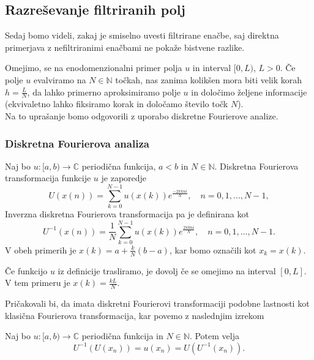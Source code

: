 \documentclass[mat2, tisk]{fmfdelo}
\newcommand{\N}{\mathbb N}
\newcommand{\C}{\mathbb C}
\begin{document}
\subsection{Razreševanje filtriranih polj}

Sedaj bomo videli, zakaj je smiselno uvesti filtrirane enačbe, saj 
direktna primerjava z nefiltriranimi enačbami ne pokaže bistvene razlike.

Omejimo, se na enodomenzionalni primer polja $u$ in interval $[0, L)$, 
$L > 0$. Če polje $u$ evalviramo na $N \in \N$ točkah, nas zanima 
kolikšen mora biti velik korah $h = \frac{L}{N}$, da lahko primerno aproksimiramo 
polje $u$ in določimo željene informacije (ekvivaletno lahko fiksiramo 
korak in določamo število točk $N$). \\
Na to uprašanje bomo odgovorili z uporabo diskretne Fourierove analize. 

\subsubsection{Diskretna Fourierova analiza}

\begin{definicija}
Naj bo $u: [a, b) \rightarrow \C$ periodična funkcija, $a < b$ in $N\in \N$. 
Diskretna Fourierova transformacija funkcije $u$ je zaporedje 
\begin{equation}
U(x(n)) = \sum_{k=0}^{N-1} u(x(k)) e^{\frac{-2\pi k n i}{N}}, \quad n = 0, 1, \dots, N-1,
\end{equation}
Inverzna diskretna Fourierova
transformacija pa je definirana kot 
\begin{equation}
  U^{-1}(x(n)) = \frac{1}{N}\sum_{k=0}^{N-1} u(x(k)) e^{\frac{2\pi k n i}{N}}, \quad n = 0, 1, \dots, N-1.
\end{equation}
V obeh primerih je $x(k) = a + \frac{k}{N}(b-a)$, kar bomo označili kot
$x_k = x(k)$.
\end{definicija}

\begin{opomba}
Če funkcijo $u$ iz definicije trasliramo, je dovolj če se 
omejimo na interval $[0, L]$. V tem primeru je $x(k) = \frac{kL}{N}$.
\end{opomba}

Pričakovali bi, da imata diskretni Fourierovi transformaciji podobne 
lastnosti kot klasična Fourierova transformacija, kar povemo z naslednjim izrekom 

\begin{izrek}
\label{izrek:iDFT}
Naj bo $u: [a, b) \rightarrow \C$ periodična funkcija in $N\in \N$. Potem velja
\begin{equation}
U^{-1}(U(x_n)) = u(x_n) = U(U^{-1}(x_n)).
\end{equation}
\end{izrek}
\end{document}

